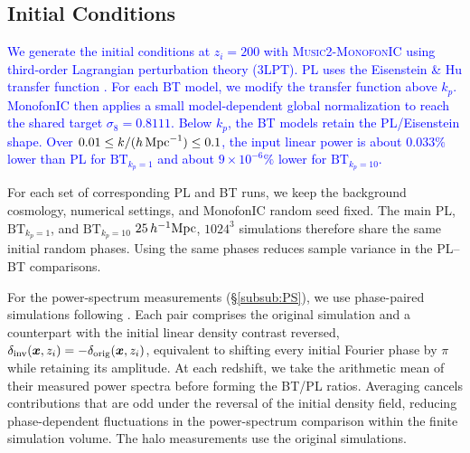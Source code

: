 \documentclass[
 reprint,
 superscriptaddress,
 nofootinbib,
 nobibnotes,
 amsmath,
 amssymb,
 aps,
 prd,
 floatfix,
 longbibliography
]{revtex4-2}
\DeclareRobustCommand{\change}[1]{\textcolor{blue}{#1}}
\DeclareRobustCommand{\BTKPone}{\ensuremath{\mathrm{BT}_{k_p=1}}}
\DeclareRobustCommand{\BTKPten}{\ensuremath{\mathrm{BT}_{k_p=10}}}
\begin{document}
\subsection{Initial Conditions}\label{sec:IC}
\change{We generate the initial conditions at \(z_i=200\) with \textsc{Music2-MonofonIC} \citep{Hahn2020MUSIC2monofonIC,Michaux2021MUSIC2monofonIC} using third-order Lagrangian perturbation theory (3LPT). PL uses the Eisenstein \& Hu transfer function \citep{Eisenstein1998}. For each BT model, we modify the transfer function above \(k_p\). MonofonIC then applies a small model-dependent global normalization to reach the shared target \(\sigma_8=0.8111\). Below \(k_p\), the BT models retain the PL/Eisenstein shape. Over \(0.01\le k/(h\,{\rm Mpc}^{-1})\le0.1\), the input linear power is about \(0.033\%\) lower than PL for \BTKPone{} and about \(9\times10^{-6}\%\) lower for \BTKPten{}.}

For each set of corresponding PL and BT runs, we keep the background cosmology, numerical settings, and MonofonIC random seed fixed. The main PL, \BTKPone{}, and \BTKPten{} \(25\,h^{-1}{\rm Mpc}\), \(1024^3\) simulations therefore share the same initial random phases. Using the same phases reduces sample variance in the PL--BT comparisons.

For the power-spectrum measurements (\S\ref{subsub:PS}), we use phase-paired simulations following \citet{Pontzen2016Inverted}. Each pair comprises the original simulation and a counterpart with the initial linear density contrast reversed, \(\delta_{\rm inv}(\boldsymbol{x},z_i)=-\delta_{\rm orig}(\boldsymbol{x},z_i)\), equivalent to shifting every initial Fourier phase by \(\pi\) while retaining its amplitude. At each redshift, we take the arithmetic mean of their measured power spectra before forming the BT/PL ratios. Averaging cancels contributions that are odd under the reversal of the initial density field, reducing phase-dependent fluctuations in the power-spectrum comparison within the finite simulation volume. The halo measurements use the original simulations.
\end{document}
